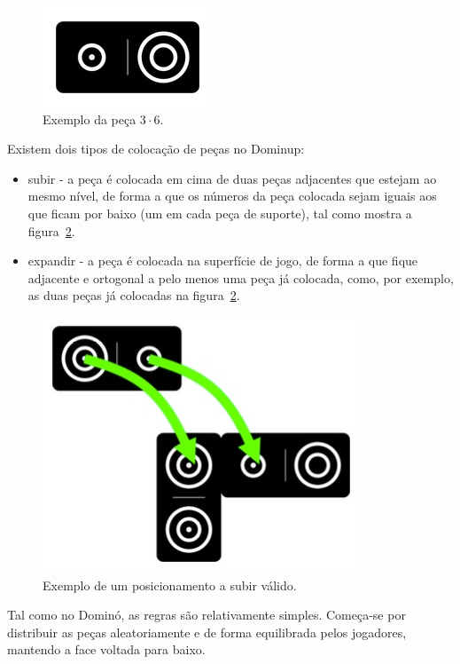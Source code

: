 \documentclass[a4paper]{article}
\begin{document}
\begin{figure}[htbp]
\begin{center}
\includegraphics[scale=0.5]{piece.jpg}
\caption{Exemplo da peça $3 \cdot 6$.}
\label{piece}
\end{center}
\end{figure}

Existem dois tipos de colocação de peças no Dominup:
\begin{itemize}
	\item subir - a peça é colocada em cima de duas peças adjacentes que estejam ao mesmo nível, de forma a que os números da peça colocada sejam iguais aos que ficam por baixo (um em cada peça de suporte), tal como mostra a figura~\ref{climb}.
	\item expandir - a peça é colocada na superfície de jogo, de forma a que fique adjacente e ortogonal a pelo menos uma peça já colocada, como, por exemplo, as duas peças já colocadas na figura~\ref{climb}.
\end{itemize}

\begin{figure}[htbp]
\begin{center}
\includegraphics[scale=0.6]{climb.jpg}
\caption{Exemplo de um posicionamento a subir válido.}
\label{climb}
\end{center}
\end{figure}

Tal como no Dominó, as regras são relativamente simples. Começa-se por distribuir as peças aleatoriamente e de forma equilibrada pelos jogadores, mantendo a face voltada para baixo. 
\end{document}
